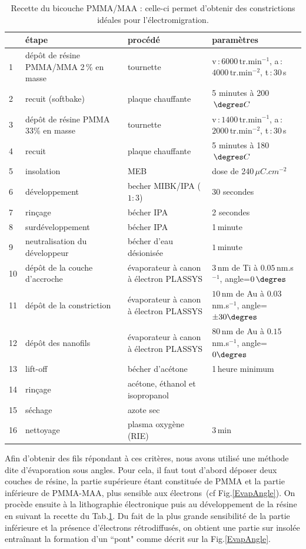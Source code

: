 \begin{table}
\begin{center}
\begin{tabular}{|p{0.5cm}|p{4cm}|p{4cm}|p{3cm}|}
  \hline
\,& \textbf{étape} & \textbf{procédé} & \textbf{paramètres} \tabularnewline
\hline
1 &  dép\^ot de résine PMMA/MMA 2\,\% en masse & tournette & v\,:\,$6000\,$tr.min$^{-1}$, a\,:\,$4000\,$tr.min$^{-2}$, t\,:\,$30\,$s 
\tabularnewline
\hline
 2 & recuit (softbake) & plaque chauffante  & 5 minutes à 200$\, \degres C$ 
\tabularnewline
\hline
 3 & dépôt de résine PMMA 33\% en masse & tournette & v\,:\,$1400\,$tr.min$^{-1}$, a\,:\,$2000\,$tr.min$^{-2}$, t\,:\,$30\,$s \tabularnewline
\hline
4 & recuit & plaque chauffante & 5 minutes à 180$\, \degres C$
\tabularnewline
\hline
5 & insolation & MEB & dose de 240\,$\mu C.cm^{-2}$
\tabularnewline
\hline
6 & développement & becher MIBK/IPA ($1:3$) & 30 secondes
\tabularnewline
\hline
7 & rinçage & bécher IPA & 2 secondes
\tabularnewline
\hline
8 & surdéveloppement & bécher IPA & 1\,minute
\tabularnewline
\hline
9 & neutralisation du développeur &bécher d'eau désionisée & $1\,$minute\tabularnewline
\hline
10 & dép\^ot de la couche d'accroche & évaporateur à canon à électron PLASSYS & $3\,$nm de Ti à $0.05\,$nm.s$^{-1}$, angle=$0\,\degres$
\tabularnewline
\hline
11 & dépôt de la constriction & évaporateur à canon à électron PLASSYS & $10\,$nm de Au à $0.03\,$nm.s$^{-1}$, angle=$\pm 30\degres$
\tabularnewline
\hline
12 &  dépôt des nanofils &  évaporateur à canon à électron PLASSYS  &  $80\,$nm de Au à $0.15\,$nm.s$^{-1}$, angle=$ 0\degres$
\tabularnewline
\hline
 13 & lift-off & bécher d'acétone & 1\,heure minimum 
\tabularnewline
\hline
14 & rinçage & acétone, éthanol et isopropanol & 
\tabularnewline
\hline
15 & séchage & azote sec & 
\tabularnewline
\hline
16 & nettoyage & plasma oxygène (RIE)& $3\,$min\tabularnewline
\hline
\end{tabular}
\caption{Recette du bicouche PMMA/MAA : celle-ci permet d'obtenir des constrictions idéales pour l'électromigration.}
\label{tab_recette_elec}
\end{center}
\end{table}


Afin d'obtenir des fils répondant à ces critères, nous avons utilisé une méthode dite d'évaporation sous angles. Pour cela, il faut tout d'abord déposer deux couches de résine, la partie supérieure étant constituée de PMMA et la partie inférieure de PMMA-MAA, plus sensible aux électrons~(cf Fig.\ref{EvapAngle}). On procède ensuite à la lithographie électronique puis au développement de la résine en suivant la recette du Tab.\ref{tab_recette_elec}. Du fait de la plus grande sensibilité de la partie inférieure et la présence d'électrons rétrodiffusés, on obtient une partie sur insolée entraînant la formation d'un ``pont" comme décrit sur la Fig.\ref{EvapAngle}.

